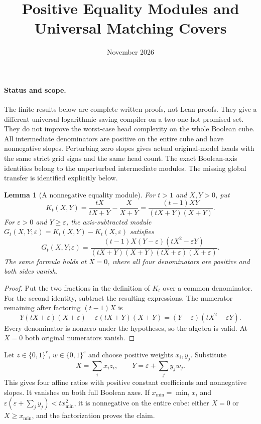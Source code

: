 \documentclass[11pt]{article}
\title{Positive Equality Modules and Universal Matching Covers}
\author{}
\date{November 2026}
\newtheorem{lemma}{Lemma}
\begin{document}
\maketitle

\paragraph{Status and scope.}
The finite results below are complete written proofs, not Lean proofs.
They give a different universal logarithmic-saving compiler on a
two-one-hot promised set. They do not improve the worst-case head
complexity on the whole Boolean cube. All intermediate denominators are
positive on the entire cube and have nonnegative slopes. Perturbing
zero slopes gives actual original-model heads with the same strict grid
signs and the same head count. The exact Boolean-axis identities belong
to the unperturbed intermediate modules. The missing global transfer is
identified explicitly below.

\begin{lemma}[A nonnegative equality module]
For $t>1$ and $X,Y>0$, put
\[
 K_t(X,Y)=\frac{tX}{tX+Y}-\frac{X}{X+Y}
 =\frac{(t-1)XY}{(tX+Y)(X+Y)}.
\]
For $\varepsilon>0$ and $Y\geq\varepsilon$, the axis-subtracted module
$G_t(X,Y;\varepsilon)=K_t(X,Y)-K_t(X,\varepsilon)$ satisfies
\[
 G_t(X,Y;\varepsilon)=
 \frac{(t-1)X(Y-\varepsilon)(tX^2-\varepsilon Y)}
 {(tX+Y)(X+Y)(tX+\varepsilon)(X+\varepsilon)}.
\]
The same formula holds at $X=0$, where all four denominators are
positive and both sides vanish.
\end{lemma}
\begin{proof}
Put the two fractions in the definition of $K_t$ over a common
denominator. For the second identity, subtract the resulting expressions.
The numerator remaining after factoring $(t-1)X$ is
\[
 Y(tX+\varepsilon)(X+\varepsilon)
 -\varepsilon(tX+Y)(X+Y)
 =(Y-\varepsilon)(tX^2-\varepsilon Y).
\]
Every denominator is nonzero under the hypotheses, so the algebra is
valid. At $X=0$ both original numerators vanish.
\end{proof}

Let $z\in\{0,1\}^r$, $w\in\{0,1\}^s$ and choose positive weights
$x_i,y_j$. Substitute
\[
 X=\sum_i x_i z_i,\qquad Y=\varepsilon+\sum_j y_jw_j.
\]
This gives four affine ratios with positive constant coefficients and
nonnegative slopes. It vanishes on both full Boolean axes.
If $x_{\min}=\min_i x_i$ and
$\varepsilon(\varepsilon+\sum_j y_j)<t x_{\min}^2$, it is nonnegative
on the entire cube: either $X=0$ or $X\geq x_{\min}$, and the
factorization proves the claim.
\end{document}
